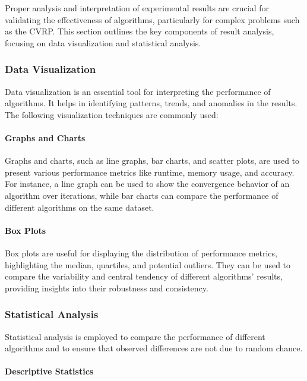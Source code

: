 \documentclass{article}
\begin{document}
    Proper analysis and interpretation of experimental results are crucial for validating the effectiveness of algorithms, particularly for complex problems such as the CVRP. This section outlines the key components of result analysis, focusing on data visualization and statistical analysis.

    \subsubsection{Data Visualization}

    Data visualization is an essential tool for interpreting the performance of algorithms. It helps in identifying patterns, trends, and anomalies in the results. The following visualization techniques are commonly used:

    \paragraph{Graphs and Charts}

    Graphs and charts, such as line graphs, bar charts, and scatter plots, are used to present various performance metrics like runtime, memory usage, and accuracy. For instance, a line graph can be used to show the convergence behavior of an algorithm over iterations, while bar charts can compare the performance of different algorithms on the same dataset.

    \paragraph{Box Plots}

    Box plots are useful for displaying the distribution of performance metrics, highlighting the median, quartiles, and potential outliers. They can be used to compare the variability and central tendency of different algorithms' results, providing insights into their robustness and consistency.

    \subsubsection{Statistical Analysis}

    Statistical analysis is employed to compare the performance of different algorithms and to ensure that observed differences are not due to random chance.

    \paragraph{Descriptive Statistics}
\end{document}
